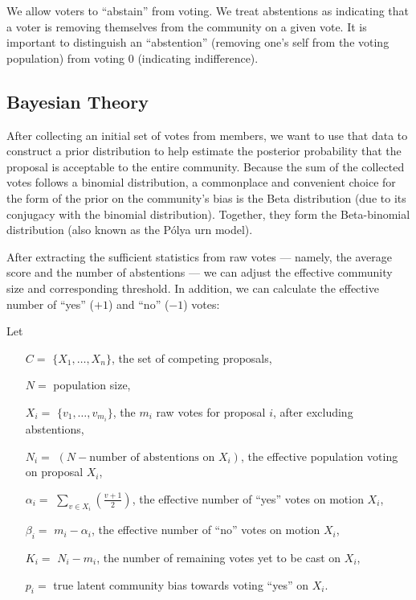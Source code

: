 \documentclass[format=acmsmall, review=true, screen=true, anonymous=true]{acmart}
\begin{document}
We allow voters to ``abstain'' from voting.
We treat abstentions as indicating that a voter is removing themselves from the community on a given vote.
It is important to distinguish an ``abstention'' (removing one's self from the voting population) from voting $0$ (indicating indifference).

\subsection{Bayesian Theory}



After collecting an initial set of votes from members, we want to use that data to construct a prior distribution to help estimate the posterior probability that the proposal is acceptable to the entire community.  Because the sum of  the collected votes follows a binomial distribution, a commonplace and convenient choice for the form of the prior on the community's bias is the Beta distribution (due to its conjugacy with the binomial distribution).  Together, they form the Beta-binomial distribution (also known as the P\'olya urn model).

After extracting the sufficient statistics from raw votes --- namely, the average score and the number of abstentions --- we can adjust the effective community size and corresponding threshold.  In addition, we can calculate the effective number of ``yes'' ($+1$) and ``no'' ($-1$) votes:

Let

\begin{itemize}
\item[$C = $] $\{X_1,\ldots, X_n\}$, the set of competing proposals,
\item[$N = $] population size,
\item[$X_i = $] $\{v_1, \ldots, v_{m_i}\}$, the $m_i$ raw votes for proposal $i$, after excluding abstentions,
\item[$N_i = $] $(N - \textrm{number of abstentions on } X_i)$, the effective population voting on proposal $X_i$,
\item[$\alpha_i = $] $\sum\limits_{v \in X_i}\left(\frac{v+1}{2}\right)$, the effective number of ``yes'' votes on motion $X_i$,
\item[$\beta_i = $] $m_i - \alpha_i$, the effective number of ``no'' votes on motion $X_i$,
\item[$K_i = $] $N_i - m_i$, the number of remaining votes yet to be cast on $X_i$,
\item[$p_i = $] true latent community bias towards voting ``yes'' on $X_i$.
\end{itemize}
\end{document}
